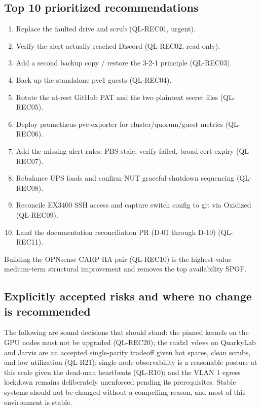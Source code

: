 \subsection{Top 10 prioritized recommendations}

\begin{enumerate}
  \item Replace the faulted  drive and scrub (QL-REC01, urgent).
  \item Verify the  alert actually reached Discord (QL-REC02, read-only).
  \item Add a second backup copy / restore the 3-2-1 principle (QL-REC03).
  \item Back up the standalone pve1 guests (QL-REC04).
  \item Rotate the at-rest GitHub PAT and the two plaintext secret files (QL-REC05).
  \item Deploy prometheus-pve-exporter for cluster/quorum/guest metrics (QL-REC06).
  \item Add the missing alert rules: PBS-stale, verify-failed, broad cert-expiry (QL-REC07).
  \item Rebalance UPS loads and confirm NUT graceful-shutdown sequencing (QL-REC08).
  \item Reconcile EX3400 SSH access and capture switch config to git via Oxidized (QL-REC09).
  \item Land the documentation reconciliation PR (D-01 through D-10) (QL-REC11).
\end{enumerate}

Building the OPNsense CARP HA pair (QL-REC10) is the highest-value medium-term
structural improvement and removes the top availability SPOF.

\subsection{Explicitly accepted risks and where no change is recommended}

The following are sound decisions that should stand: the pinned
 kernels on the GPU nodes must not be upgraded (QL-REC20);
the raidz1 vdevs on QuarkyLab and Jarvis are an accepted single-parity tradeoff
given hot spares, clean scrubs, and low utilization (QL-R21); single-node
observability is a reasonable posture at this scale given the dead-man heartbeats
(QL-R10); and the VLAN 1 egress lockdown remains deliberately unenforced pending
its prerequisites. Stable systems should not be changed without a compelling
reason, and most of this environment is stable.

